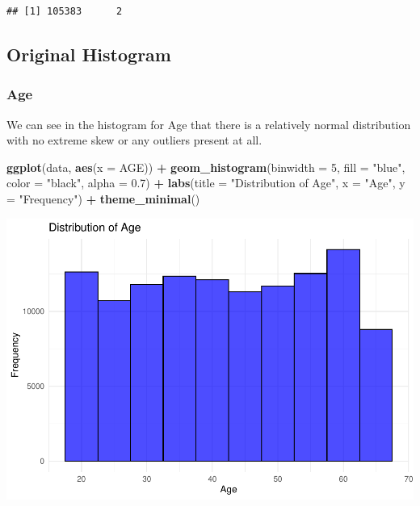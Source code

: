 \documentclass[
]{article}
\newenvironment{Shaded}{\begin{snugshade}}{\end{snugshade}}
\newcommand{\AttributeTok}[1]{\textcolor[rgb]{0.13,0.29,0.53}{#1}}
\newcommand{\DecValTok}[1]{\textcolor[rgb]{0.00,0.00,0.81}{#1}}
\newcommand{\FloatTok}[1]{\textcolor[rgb]{0.00,0.00,0.81}{#1}}
\newcommand{\FunctionTok}[1]{\textcolor[rgb]{0.13,0.29,0.53}{\textbf{#1}}}
\newcommand{\NormalTok}[1]{#1}
\newcommand{\SpecialCharTok}[1]{\textcolor[rgb]{0.81,0.36,0.00}{\textbf{#1}}}
\newcommand{\StringTok}[1]{\textcolor[rgb]{0.31,0.60,0.02}{#1}}
\begin{document}
\begin{verbatim}
## [1] 105383      2
\end{verbatim}

\subsection{Original Histogram}\label{original-histogram}

\subsubsection{Age}\label{age}

We can see in the histogram for Age that there is a relatively normal
distribution with no extreme skew or any outliers present at all.

\begin{Shaded}
\begin{Highlighting}[]
\FunctionTok{ggplot}\NormalTok{(data, }\FunctionTok{aes}\NormalTok{(}\AttributeTok{x =}\NormalTok{ AGE)) }\SpecialCharTok{+}
  \FunctionTok{geom\_histogram}\NormalTok{(}\AttributeTok{binwidth =} \DecValTok{5}\NormalTok{, }\AttributeTok{fill =} \StringTok{"blue"}\NormalTok{, }\AttributeTok{color =} \StringTok{"black"}\NormalTok{, }\AttributeTok{alpha =} \FloatTok{0.7}\NormalTok{) }\SpecialCharTok{+}
  \FunctionTok{labs}\NormalTok{(}\AttributeTok{title =} \StringTok{"Distribution of Age"}\NormalTok{, }\AttributeTok{x =} \StringTok{"Age"}\NormalTok{, }\AttributeTok{y =} \StringTok{"Frequency"}\NormalTok{) }\SpecialCharTok{+}
  \FunctionTok{theme\_minimal}\NormalTok{()}
\end{Highlighting}
\end{Shaded}

\includegraphics{Project_1_456_files/figure-latex/unnamed-chunk-5-1.pdf}
\end{document}
